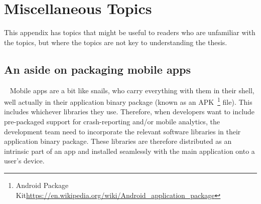 \chapter{Miscellaneous Topics}
This appendix has topics that might be useful to readers who are unfamiliar with the topics, but where the topics are not key to understanding the thesis. 

\section{An aside on packaging mobile apps}~\label{section-packaging-mobile-apps}
Mobile apps are a bit like snails, who carry everything with them in their shell, well actually in their application binary package (known as an APK~\footnote{Android Package Kit\url{https://en.wikipedia.org/wiki/Android_application_package}} file). This includes whichever libraries they use. Therefore, when developers want to include pre-packaged support for crash-reporting and/or mobile analytics, the development team need to incorporate the relevant software libraries in their application binary package. These libraries are therefore distributed as an intrinsic part of an app and installed seamlessly with the main application onto a user's device.